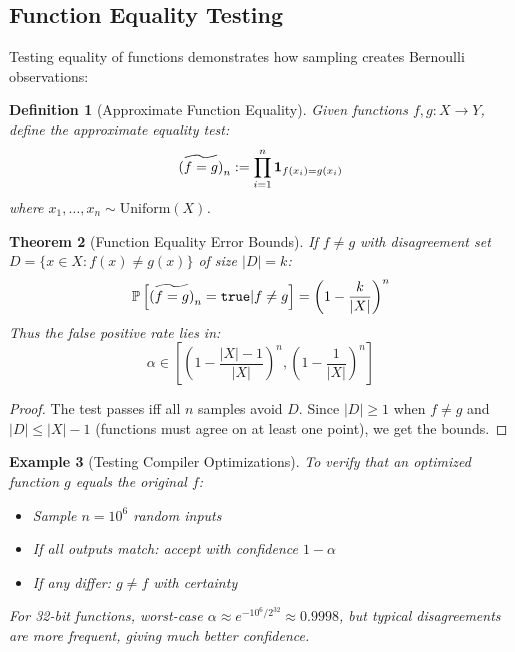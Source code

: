 \documentclass[11pt,final,hidelinks]{article}
\newtheorem{theorem}{Theorem}[section]
\newtheorem{definition}[theorem]{Definition}
\newtheorem{example}[theorem]{Example}
\begin{document}
\subsection{Function Equality Testing}

Testing equality of functions demonstrates how sampling creates Bernoulli observations:

\begin{definition}[Approximate Function Equality]
Given functions $f, g: X \to Y$, define the approximate equality test:
\begin{equation}
\widetilde{(f = g)}_n := \prod_{i=1}^n \mathbf{1}_{f(x_i) = g(x_i)}
\end{equation}
where $x_1, \ldots, x_n \sim \text{Uniform}(X)$.
\end{definition}

\begin{theorem}[Function Equality Error Bounds]
If $f \neq g$ with disagreement set $D = \{x \in X : f(x) \neq g(x)\}$ of size $|D| = k$:
\begin{equation}
\mathbb{P}\left[\widetilde{(f = g)}_n = \mathtt{true} | f \neq g\right] = \left(1 - \frac{k}{|X|}\right)^n
\end{equation}
Thus the false positive rate lies in:
\begin{equation}
\alpha \in \left[\left(1 - \frac{|X|-1}{|X|}\right)^n, \left(1 - \frac{1}{|X|}\right)^n\right]
\end{equation}
\end{theorem}

\begin{proof}
The test passes iff all $n$ samples avoid $D$. Since $|D| \geq 1$ when $f \neq g$ and $|D| \leq |X|-1$ (functions must agree on at least one point), we get the bounds.
\end{proof}

\begin{example}[Testing Compiler Optimizations]
To verify that an optimized function $g$ equals the original $f$:
\begin{itemize}
    \item Sample $n = 10^6$ random inputs
    \item If all outputs match: accept with confidence $1 - \alpha$
    \item If any differ: $g \neq f$ with certainty
\end{itemize}
For 32-bit functions, worst-case $\alpha \approx e^{-10^6/2^{32}} \approx 0.9998$, but typical disagreements are more frequent, giving much better confidence.
\end{example}
\end{document}
